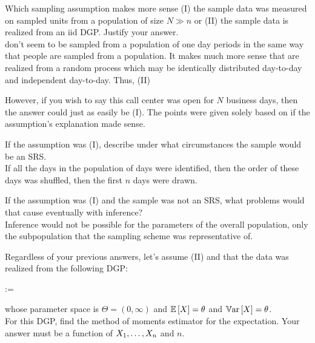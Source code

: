 \documentclass[12pt]{article}
\begin{document}
\begin{enumerate}[(a)]

 Which sampling assumption makes more sense (I) the sample data was measured on sampled units from a population of size $N \gg n$ or (II) the sample data is realized from an iid DGP. Justify your answer. \color{blue}\\

 don't seem to be sampled from a population of one day periods in the same way that people are sampled from a population. It makes much more sense that  are realized from a random process which may be identically distributed day-to-day and independent day-to-day. Thus, (II)

However, if you wish to say this call center was open for $N$ business days, then the answer could just as easily be (I). The points were given solely based on if the assumption's explanation made sense.

\color{black}

 If the assumption was (I), describe under what circumstances the sample would be an SRS.\color{blue}\\

If all the days in the population of days were identified, then the order of these days was shuffled, then the first $n$ days were drawn.

\color{black}

 If the assumption was (I) and the sample was not an SRS, what problems would that cause eventually with inference? \color{blue}\\

Inference would not be possible for the parameters of the overall population, only the subpopulation that the sampling scheme was representative of.

\color{black}\pagebreak

 Regardless of your previous answers, let's assume (II) and that the data was
realized from the following DGP:

\beqn
\Xoneton \iid \poisson{\theta} :=   
\eeqn

\noindent whose parameter space is $\Theta = (0, \infty)$ and $\mathbb{E}\left[X\right] = \theta$ and $\mathbb{V}\text{ar}\left[X\right] = \theta$. \\

For this DGP, find the method of moments estimator for the expectation. Your answer must be a function of $X_1, \ldots, X_n$ and $n$. \color{blue}


\end{enumerate}
\end{document}
